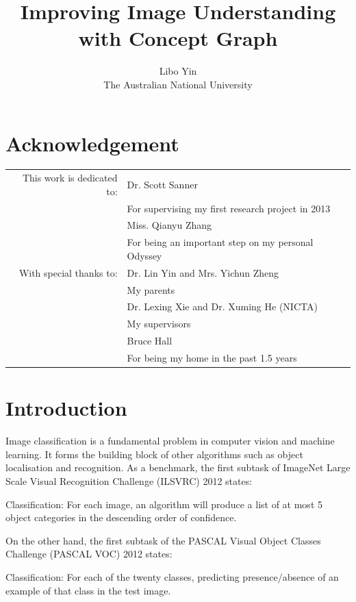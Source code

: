 \documentclass[11pt,a4paper]{book}
\begin{document}
\title{Improving Image Understanding with Concept Graph}
\author{Libo Yin\\The Australian National University}
\maketitle

\chapter{Acknowledgement}

\begin{table}[htbp]
\centering
\begin{tabular}{rl}
This work is dedicated to: & Dr. Scott Sanner\\
 & For supervising my first research project in 2013\\
 & Miss. Qianyu Zhang\\
 & For being an important step on my personal Odyssey\\
With special thanks to: & Dr. Lin Yin and Mrs. Yichun Zheng\\
 & My parents\\
 & Dr. Lexing Xie and Dr. Xuming He (NICTA)\\
 & My supervisors\\
 & Bruce Hall\\
 & For being my home in the past 1.5 years
\end{tabular}
\end{table}

\chapter{Introduction}
\label{chap:intro}

Image classification is a fundamental problem in computer vision and machine learning. It forms the building block of other algorithms such as object localisation and recognition. As a benchmark, the first subtask of ImageNet Large Scale Visual Recognition Challenge (ILSVRC) 2012 \cite{ilsvrc15} states:
\begin{displayquote}
Classification: For each image, an algorithm will produce a list of at most 5 object categories in the descending order of confidence.
\end{displayquote}

On the other hand, the first subtask of the PASCAL Visual Object Classes Challenge (PASCAL VOC) 2012 \cite{pascal-voc-2012} states:
\begin{displayquote}
Classification: For each of the twenty classes, predicting presence/absence of an example of that class in the test image.
\end{displayquote}
\end{document}
